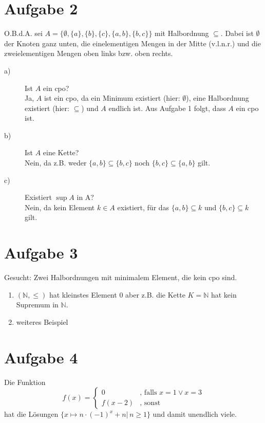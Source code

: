 \documentclass[11pt,a4paper,ngerman]{article}
\begin{document}
\section*{Aufgabe 2}
O.B.d.A. sei $A = \{ \emptyset, \{ a \}, \{ b \}, \{ c \}, \{ a,b \}, \{ b,c \} \}$ mit Halbordnung $\subseteq$. Dabei ist $\emptyset$ der Knoten ganz unten, die einelementigen Mengen in der Mitte (v.l.n.r.) und die zweielementigen Mengen oben links bzw. oben rechts.

\begin{description}
\item[a)] Ist $A$ ein cpo? \\
Ja, $A$ ist ein cpo, da ein Minimum existiert (hier: $\emptyset$), eine Halbordnung existiert (hier: $\subseteq$) und $A$ endlich ist. Aus Aufgabe 1 folgt, dass $A$ ein cpo ist.
\item[b)] Ist $A$ eine Kette?\\
Nein, da z.B. weder $\{ a,b \} \subseteq \{ b,c \}$ noch $\{ b,c \} \subseteq \{ a,b \}$ gilt.
\item[c)] Existiert $\sup A$ in A?\\
Nein, da kein Element $k \in A$ existiert, für das $\{ a,b \} \subseteq k$ und $\{ b,c \} \subseteq k$ gilt.
\end{description}


\section*{Aufgabe 3}
Gesucht: Zwei Halbordnungen mit minimalem Element, die kein cpo sind.

\begin{enumerate}
\item $(\mathbb{N}, \leq)$ hat kleinstes Element $0$ aber z.B. die Kette $K = \mathbb{N}$ hat kein Supremum in $\mathbb{N}$.
\item weiteres Beispiel
\end{enumerate}


\section*{Aufgabe 4}
Die Funktion
$$ f(x) = \begin{cases}0 & \text{, falls } x = 1 \lor x = 3\\
                       f(x-2) & \text{, sonst} \end{cases}$$
hat die Lösungen $\{ x \mapsto n \cdot (-1)^x + n | \, n \geq 1 \}$ und damit unendlich viele.

\label{LastPage}
\end{document}
